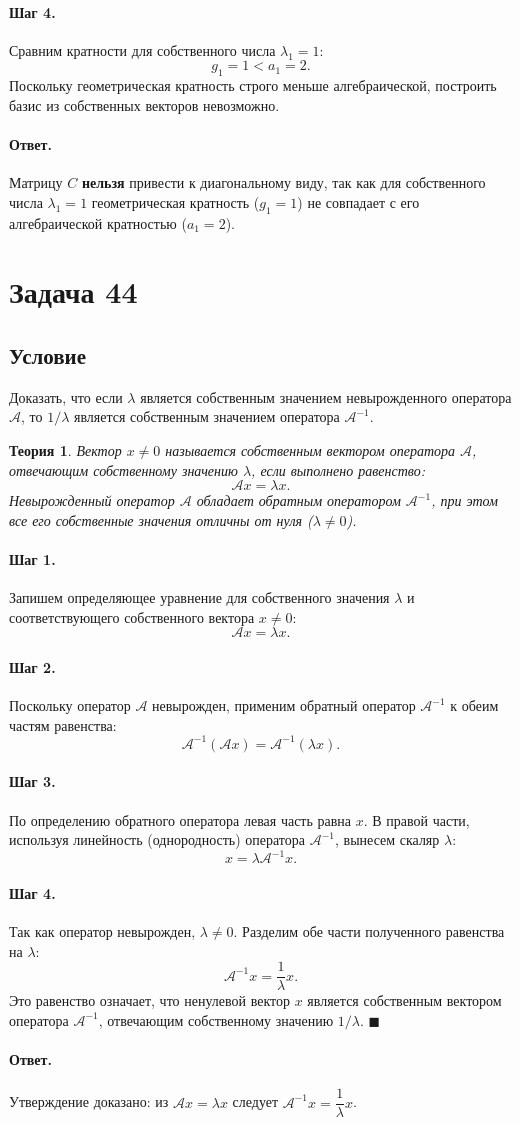 \documentclass[12pt,a4paper]{article}
\theoremstyle{solution}
\newtheorem*{theory}{Теория}
\newcommand{\task}[1]{\newpage\section*{Задача #1}}
\newcommand{\answer}{\paragraph{Ответ.}}
\newcommand{\step}[1]{\paragraph{Шаг #1.}}
\begin{document}
\step{4} Сравним кратности для собственного числа $\lambda_1 = 1$:
\[
g_1 = 1 < a_1 = 2.
\]
Поскольку геометрическая кратность строго меньше алгебраической, построить базис из собственных векторов невозможно.

\answer
Матрицу $C$ \textbf{нельзя} привести к диагональному виду, так как для собственного числа $\lambda_1 = 1$ геометрическая кратность ($g_1 = 1$) не совпадает с его алгебраической кратностью ($a_1 = 2$).

\task{44}
\subsection*{Условие}
Доказать, что если $\lambda$ является собственным значением невырожденного оператора $\mathcal{A}$, то $1/\lambda$ является собственным значением оператора $\mathcal{A}^{-1}$.

\begin{theory}
Вектор $x \neq 0$ называется собственным вектором оператора $\mathcal{A}$, отвечающим собственному значению $\lambda$, если выполнено равенство:
\[
\mathcal{A}x = \lambda x.
\]
Невырожденный оператор $\mathcal{A}$ обладает обратным оператором $\mathcal{A}^{-1}$, при этом все его собственные значения отличны от нуля ($\lambda \neq 0$).
\end{theory}

\step{1} Запишем определяющее уравнение для собственного значения $\lambda$ и соответствующего собственного вектора $x \neq 0$:
\[
\mathcal{A}x = \lambda x.
\]

\step{2} Поскольку оператор $\mathcal{A}$ невырожден, применим обратный оператор $\mathcal{A}^{-1}$ к обеим частям равенства:
\[
\mathcal{A}^{-1}(\mathcal{A}x) = \mathcal{A}^{-1}(\lambda x).
\]

\step{3} По определению обратного оператора левая часть равна $x$. В правой части, используя линейность (однородность) оператора $\mathcal{A}^{-1}$, вынесем скаляр $\lambda$:
\[
x = \lambda \mathcal{A}^{-1}x.
\]

\step{4} Так как оператор невырожден, $\lambda \neq 0$. Разделим обе части полученного равенства на $\lambda$:
\[
\mathcal{A}^{-1}x = \frac{1}{\lambda} x.
\]
Это равенство означает, что ненулевой вектор $x$ является собственным вектором оператора $\mathcal{A}^{-1}$, отвечающим собственному значению $1/\lambda$. \quad$\blacksquare$

\answer
Утверждение доказано: из $\mathcal{A}x = \lambda x$ следует $\mathcal{A}^{-1}x = \dfrac{1}{\lambda}x$.
\end{document}
